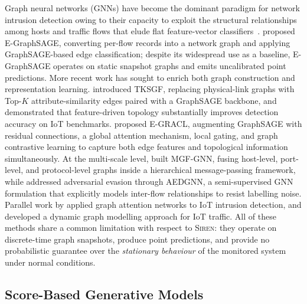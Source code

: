 Graph neural networks (GNNs) have become the dominant paradigm for network
intrusion detection owing to their capacity to exploit the structural
relationships among hosts and traffic flows that elude flat feature-vector
classifiers~\citep{Zhong2024survey}.
\citet{Lo2022egraphsage} proposed E-GraphSAGE, converting per-flow records
into a network graph and applying GraphSAGE-based edge classification;
despite its widespread use as a baseline, E-GraphSAGE operates on static
snapshot graphs and emits uncalibrated point predictions.
More recent work has sought to enrich both graph construction and
representation learning.
\citet{Ngo2025tksgf} introduced TKSGF, replacing physical-link graphs with
Top-$K$ attribute-similarity edges paired with a GraphSAGE backbone, and
demonstrated that feature-driven topology substantially improves detection
accuracy on IoT benchmarks.
\citet{Lin2025egracl} proposed E-GRACL, augmenting GraphSAGE with residual
connections, a global attention mechanism, local gating, and graph
contrastive learning to capture both edge features and topological information
simultaneously.
At the multi-scale level, \citet{Liu2025mgfgnn} built MGF-GNN, fusing
host-level, port-level, and protocol-level graphs inside a hierarchical
message-passing framework, while \citet{Zhang2026aedgnn} addressed adversarial
evasion through AEDGNN, a semi-supervised GNN formulation that explicitly
models inter-flow relationships to resist labelling noise.
Parallel work by \citet{Ahanger2025gat} applied graph attention networks to
IoT intrusion detection, and \citet{VillegasCh2025dynamic} developed a
dynamic graph modelling approach for IoT traffic.
All of these methods share a common limitation with respect to \textsc{Siren}:
they operate on discrete-time graph snapshots, produce point predictions, and
provide no probabilistic guarantee over the \emph{stationary behaviour} of the
monitored system under normal conditions.

\subsection{Score-Based Generative Models}

